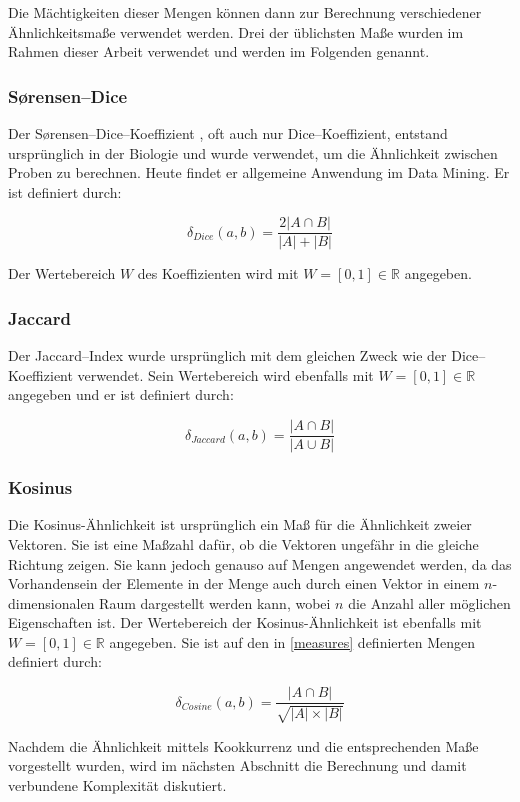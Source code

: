 Die Mächtigkeiten dieser Mengen können dann zur Berechnung verschiedener Ähnlichkeitsmaße verwendet werden. Drei der üblichsten Maße wurden im Rahmen dieser Arbeit verwendet und werden im Folgenden genannt.

\subsubsection{Sørensen--Dice}

Der Sørensen--Dice--Koeffizient \cite{st1948} \cite{ld1945}, oft auch nur Dice--Koeffizient, entstand ursprünglich in der Biologie und wurde verwendet, um die Ähnlichkeit zwischen Proben zu berechnen. Heute findet er allgemeine Anwendung im Data Mining. Er ist definiert durch:

\[
\delta_{Dice}(a, b) = \frac{2|A \cap B|}{|A|+|B|}
\]

Der Wertebereich \(W\) des Koeffizienten wird mit \(W=[0,1] \in \mathbb{R}\) angegeben.

\subsubsection{Jaccard}

Der Jaccard--Index \cite{pj19012} wurde ursprünglich mit dem gleichen Zweck wie der Dice--Koeffizient verwendet. Sein Wertebereich wird ebenfalls mit \(W=[0,1] \in \mathbb{R}\) angegeben und er ist definiert durch:

\[
\delta_{Jaccard}(a,b) = \frac{|A \cap B|}{|A \cup B|}
\]

\subsubsection{Kosinus}

Die Kosinus-Ähnlichkeit \cite{hkp2012} ist ursprünglich ein Maß für die Ähnlichkeit zweier Vektoren. Sie ist eine Maßzahl dafür, ob die Vektoren ungefähr in die gleiche Richtung zeigen. Sie kann jedoch genauso auf Mengen angewendet werden, da das Vorhandensein der Elemente in der Menge auch durch einen Vektor in einem \(n\)-dimensionalen Raum dargestellt werden kann, wobei \(n\) die Anzahl aller möglichen Eigenschaften ist. Der Wertebereich der Kosinus-Ähnlichkeit ist ebenfalls mit \(W=[0,1] \in \mathbb{R}\) angegeben. Sie ist auf den in \cref{measures} definierten Mengen definiert durch:

\[
\delta_{Cosine}(a, b) = \frac{|A \cap B|}{\sqrt{|A| \times |B|}}
\]

Nachdem die Ähnlichkeit mittels Kookkurrenz und die entsprechenden Maße vorgestellt wurden, wird im nächsten Abschnitt die Berechnung und damit verbundene Komplexität diskutiert.

